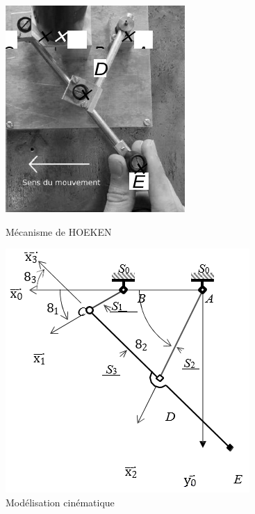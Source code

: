 \begin{figure}[ht!]
\begin{center}
\begin{minipage}{0.45\linewidth}
 \includegraphics[width=0.8\linewidth]{img/Figure4}
 \caption{Mécanisme de HOEKEN}
 \label{fig4}
\end{minipage}\hfill
\begin{minipage}{0.45\linewidth}
 \includegraphics[width=0.8\linewidth]{img/Figure5}
 \caption{Modélisation cinématique}
 \label{fig5}
\end{minipage}
\end{center}
\end{figure}


